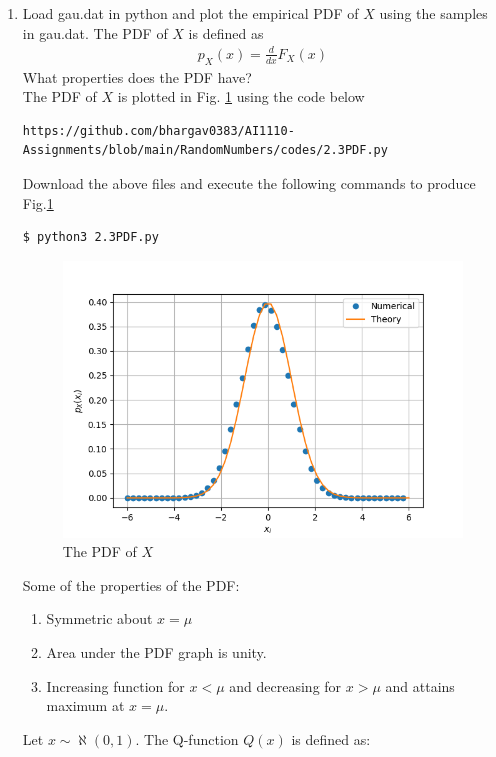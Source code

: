 \documentclass[journal,12pt,twocolumn]{IEEEtran}
\renewcommand\thesection{\arabic{section}}
\begin{document}
\begin{enumerate}[label=\thesection.\arabic*
,ref=\thesection.\theenumi]
\item
Load gau.dat in python and plot the empirical PDF of $X$ using the samples in gau.dat. The PDF of $X$ is defined as
\begin{align}
p_{X}(x) = \frac{d}{dx}F_{X}(x)
\end{align}
What properties does the PDF have?
\\
\solution The PDF of $X$ is plotted in Fig. \ref{fig:2.3} using the code below
\begin{lstlisting}
https://github.com/bhargav0383/AI1110-Assignments/blob/main/RandomNumbers/codes/2.3PDF.py
\end{lstlisting}
Download the above files and execute the following commands to produce Fig.\ref{fig:2.3}
\begin{lstlisting}
$ python3 2.3PDF.py
\end{lstlisting}
\begin{figure}[!h]
\centering
\includegraphics[width=\columnwidth]{./figs/2.3PDF.png}
\caption{The PDF of $X$}
\label{fig:2.3}
\end{figure}
Some of the properties of the PDF:
\begin{enumerate}
    \item Symmetric about $x=\mu$
    \item Area under the PDF graph is unity.
    \item Increasing function for $x<\mu$ and decreasing for $x>\mu$ and attains maximum at $x=\mu$.
\end{enumerate}
Let $x \sim \aleph(0,1)$. The Q-function $\displaystyle{Q(x)}$ is defined as:
\begin{align}

\end{align}
\end{enumerate}
\end{document}
